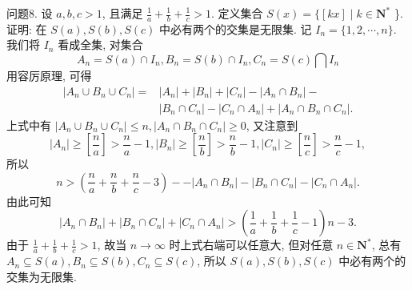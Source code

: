 问题8. 设 $a, b, c>1$, 且满足 $\frac{1}{a}+\frac{1}{b}+\frac{1}{c}>1$. 定义集合 $S(x)=\{[k x] \mid k \in \mathbf{N}^*$ \}.证明: 在 $S(a), S(b), S(c)$ 中必有两个的交集是无限集.
记 $I_n=\{1,2, \cdots, n\}$. 我们将 $I_n$ 看成全集, 对集合
$$
A_n=S(a) \cap I_n, B_n=S(b) \cap I_n, C_n=S(c) \bigcap I_n
$$
用容厉原理, 可得
$$
\begin{aligned}
\left|A_n \cup B_n \cup C_n\right|= & \left|A_n\right|+\left|B_n\right|+\left|C_n\right|-\left|A_n \cap B_n\right|- \\
& \left|B_n \cap C_n\right|-\left|C_n \cap A_n\right|+\left|A_n \cap B_n \cap C_n\right| .
\end{aligned}
$$
上式中有 $\left|A_n \cup B_n \cup C_n\right| \leqslant n,\left|A_n \cap B_n \cap C_n\right| \geqslant 0$, 又注意到
$$
\left|A_n\right| \geqslant\left[\frac{n}{a}\right]>\frac{n}{a}-1,\left|B_n\right| \geqslant\left[\frac{n}{b}\right]>\frac{n}{b}-1,\left|C_n\right| \geqslant\left[\frac{n}{c}\right]>\frac{n}{c}-1,
$$
所以
$$
n>\left(\frac{n}{a}+\frac{n}{b}+\frac{n}{c}-3\right)--\left|A_n \cap B_n\right|-\left|B_n \cap C_n\right|-\left|C_n \cap A_n\right| .
$$
由此可知
$$
\left|A_n \cap B_n\right|+\left|B_n \cap C_n\right|+\left|C_n \cap A_n\right|>\left(\frac{1}{a}+\frac{1}{b}+\frac{1}{c}-1\right) n-3 .
$$
由于 $\frac{1}{a}+\frac{1}{b}+\frac{1}{c}>1$, 故当 $n \rightarrow \infty$ 时上式右端可以任意大, 但对任意 $n \in \mathbf{N}^*$, 总有 $A_n \subseteq S(a), B_n \subseteq S(b), C_n \subseteq S(c)$, 所以 $S(a), S(b), S(c)$ 中必有两个的交集为无限集.


